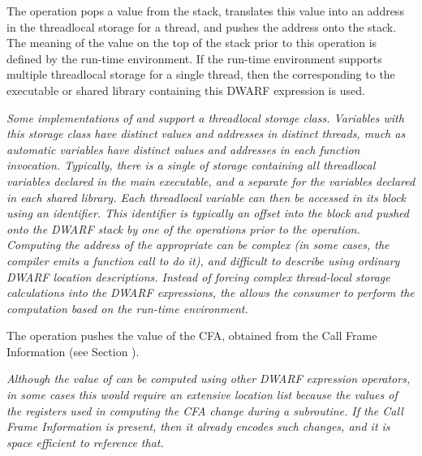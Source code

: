 \begin{enumerate}[1. ]
The  
operation pops a value from the stack, translates this
value into an address in the 
thread\dash local storage for a thread, and pushes the address 
onto the stack. 
The meaning of the value on the top of the stack prior to this 
operation is defined by the run-time environment.  If the run-time 
environment supports multiple thread\dash local storage 
 for a single thread, then the  
corresponding to the executable or shared 
library containing this DWARF expression is used.
   
\textit{Some implementations of 
 and  support a
thread\dash local storage class. Variables with this storage class
have distinct values and addresses in distinct threads, much
as automatic variables have distinct values and addresses in
each function invocation. Typically, there is a single 
of storage containing all thread\dash local variables declared in
the main executable, and a separate  for the variables
declared in each shared library. 
Each thread\dash local variable can then be accessed in its block using an
identifier. This identifier is typically an offset into the block and pushed
onto the DWARF stack by one of the \DWOPconst{} operations prior to the
\DWOPformtlsaddress{} operation. 
Computing the address of
the appropriate  can be complex (in some cases, the
compiler emits a function call to do it), and difficult
to describe using ordinary DWARF location descriptions.
Instead of    forcing complex thread-local storage calculations into 
the DWARF expressions, the \DWOPformtlsaddress{} allows the consumer 
to perform the computation based on the run-time environment.}

The  
operation pushes the value of the
CFA, obtained from the Call Frame Information 
(see Section ).

\textit{Although the value of 
can be computed using other DWARF expression operators,
in some cases this would require an extensive location list
because the values of the registers used in computing the
CFA change during a subroutine. If the 
Call Frame Information 
is present, then it already encodes such changes, and it is
space efficient to reference that.}
\end{enumerate}

